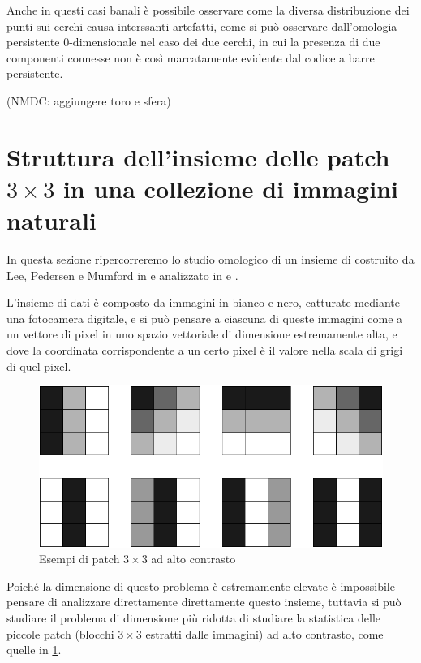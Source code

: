 Anche in questi casi banali è possibile osservare come la diversa distribuzione dei punti sui cerchi causa interssanti artefatti, come si può osservare dall'omologia persistente 0-dimensionale nel caso dei due cerchi, in cui la presenza di due componenti connesse non è così marcatamente evidente dal codice a barre persistente.

(NMDC: aggiungere toro e sfera)

\section{Struttura dell'insieme delle patch $3\times 3$ in una collezione di immagini naturali}

In questa sezione ripercorreremo lo studio omologico di un insieme di costruito da
Lee, Pedersen e Mumford in \cite{Lee2003} e analizzato in \cite{Carlsson2008} e \cite{DeSilva2004}.

L'insieme di dati è composto da immagini in bianco e nero, catturate mediante una fotocamera digitale, e si può pensare a ciascuna di queste immagini come a un vettore di pixel in uno spazio vettoriale di dimensione estremamente alta, e dove la coordinata corrispondente a un certo pixel è il valore nella scala di grigi di quel pixel.

\begin{figure}[ht]
  \begin{center}
    \includegraphics[width=.8\linewidth]{gfx/example_patches.pdf}
    \caption{Esempi di patch $3\times 3$ ad alto contrasto}
    \label{fig:examplepatches}
  \end{center}
\end{figure}

Poiché la dimensione di questo problema è estremamente elevate è impossibile pensare di analizzare direttamente direttamente questo insieme, tuttavia si può studiare il problema di dimensione più ridotta di studiare la statistica delle piccole patch (blocchi $3\times 3$ estratti dalle immagini) ad alto contrasto, come quelle in \cref{fig:examplepatches}.

